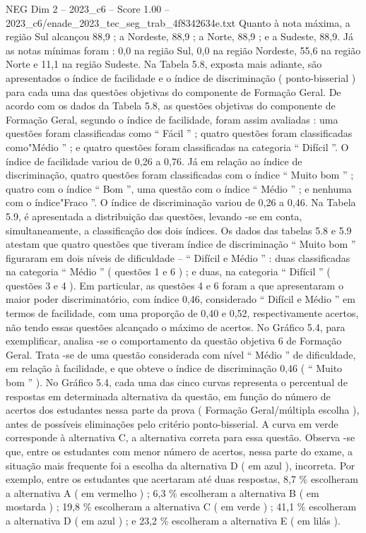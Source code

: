 \begin{textsample}{NEG Dim 2 – 2023\_c6 – Score 1.00 – 2023\_c6/enade\_2023\_tec\_seg\_trab\_4f8342634e.txt}
Quanto à nota máxima, a região Sul alcançou 88,9 ; a Nordeste, 88,9 ; a Norte, 88,9 ; e a Sudeste, 88,9.
Já as notas mínimas foram : 0,0 na região Sul, 0,0 na região Nordeste, 55,6 na região Norte e 11,1 na região Sudeste.
Na Tabela 5.8, exposta mais adiante, são apresentados o índice de facilidade e o índice de discriminação ( ponto-bisserial ) para cada uma das questões objetivas do componente de Formação Geral.
De acordo com os dados da Tabela 5.8, as questões objetivas do componente de Formação Geral, segundo o índice de facilidade, foram assim avaliadas : uma questões foram classificadas como “ Fácil ” ; quatro questões foram classificadas como"Médio ” ; e quatro questões foram classificadas na categoria “ Difícil ”.
O índice de facilidade variou de 0,26 a 0,76.
Já em relação ao índice de discriminação, quatro questões foram classificadas com o índice “ Muito bom ” ; quatro com o índice “ Bom ”, uma questão com o índice “ Médio ” ; e nenhuma com o índice"Fraco ”.
O índice de discriminação variou de 0,26 a 0,46.
Na Tabela 5.9, é apresentada a distribuição das questões, levando -se em conta, simultaneamente, a classificação dos dois índices.
Os dados das tabelas 5.8 e 5.9 atestam que quatro questões que tiveram índice de discriminação “ Muito bom ” figuraram em dois níveis de dificuldade – “ Difícil e Médio ” : duas classificadas na categoria “ Médio ” ( questões 1 e 6 ) ; e duas, na categoria “ Difícil ” ( questões 3 e 4 ).
Em particular, as questões 4 e 6 foram a que apresentaram o maior poder discriminatório, com índice 0,46, considerado “ Difícil e Médio ” em termos de facilidade, com uma proporção de 0,40 e 0,52, respectivamente acertos, não tendo essas questões alcançado o máximo de acertos.
No Gráfico 5.4, para exemplificar, analisa -se o comportamento da questão objetiva 6 de Formação Geral.
Trata -se de uma questão considerada com nível “ Médio ” de dificuldade, em relação à facilidade, e que obteve o índice de discriminação 0,46 ( “ Muito bom ” ).
No Gráfico 5.4, cada uma das cinco curvas representa o percentual de respostas em determinada alternativa da questão, em função do número de acertos dos estudantes nessa parte da prova ( Formação Geral/múltipla escolha ), antes de possíveis eliminações pelo critério ponto-bisserial.
A curva em verde corresponde à alternativa C, a alternativa correta para essa questão.
Observa -se que, entre os estudantes com menor número de acertos, nessa parte do exame, a situação mais frequente foi a escolha da alternativa D ( em azul ), incorreta.
Por exemplo, entre os estudantes que acertaram até duas respostas, 8,7 \% escolheram a alternativa A ( em vermelho ) ; 6,3 \% escolheram a alternativa B ( em mostarda ) ; 19,8 \% escolheram a alternativa C ( em verde ) ; 41,1 \% escolheram a alternativa D ( em azul ) ; e 23,2 \% escolheram a alternativa E ( em lilás ).

\end{textsample}

